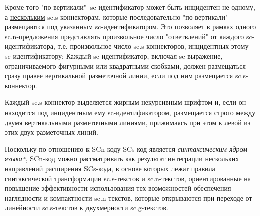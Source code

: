 Кроме того "по вертикали"\ sc-идентификатор может быть инцидентен не одному, а \uline{нескольким} sc.s-коннекторам, которые последовательно "по вертикали"{} размещаются \uline{под} указанным sc-идентификатором. Это позволяет в рамках одного sc.n-предложения представлять произвольное число "ответвлений"{} от каждого sc-идентификатора, т.е. произвольное число sc.s-коннекторов, инцидентных этому sc-идентификатору;
Каждый sc-идентификатор, включая sc-выражение, ограничиваемого фигурными или квадратными скобками, должен размещаться сразу правее вертикальной разметочной линии, если \uline{под ним} размещается sc.s-коннектор.

Каждый sc.s-коннектор выделяется жирным некурсивным шрифтом и, если он находится \uline{под} инцидентным ему sc-идентификатором, размещается строго между двумя вертикальными разметочными линиями, прижимаясь при этом к левой из этих двух разметочных линий.

Поскольку по отношению к SCn-коду SCs-код является \textit{синтаксическим ядром языка*}, SCn-код можно рассматривать как результат интеграции нескольких направлений расширения SCs-кода, в основе которых лежат правила синтаксической трансформации sc.s-текстов и sc.n-текстов, ориентированные на повышение эффективности использования тех возможностей обеспечения наглядности и компактности sc.n-текстов, которые открываются при переходе от линейности sc.s-текстов к двухмерности sc.g-текстов.

%